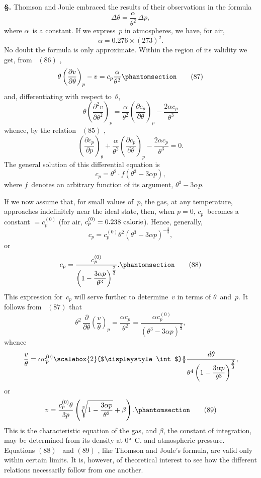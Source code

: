 \documentclass[12pt]{book}[2005/09/16]
\newcommand{\Typo}[2]{#2}
\newcommand{\Chg}[2]{#2}
\newcommand{\Add}[1]{\Chg{}{#1}}
\newcommand{\Section}[1]{
  \medskip\par\textbf{§\;#1}
  \label{section:#1}
}
\newcommand{\Tag}[1]{%
  \phantomsection\label{eqn:#1}\tag*{\ensuremath{#1}}%
}
\newcommand{\Eq}[1]{%
  \hyperref[eqn:#1]{\ensuremath{#1}}%
}
\newcommand{\PageSep}[1]{\ignorespaces}
\newcommand{\efrac}[2]{\tfrac{#1}{#2}}
\newcommand{\dd}{\partial}
\newcommand{\Unit}[1]{\text{\upshape #1}}
\newcommand{\Bigint}[1][2]{%
  \scalebox{#1}{$\displaystyle\int$}{\kern-4pt}%
}
\begin{document}
\Section{159.} Thomson and Joule embraced the results of their
observations in the formula
\[
\Delta \theta = \frac{\alpha}{\theta^{2}}\, \Delta p,
\]
where $\alpha$~is a constant. If we express~$p$ in atmospheres, we
have, for air,
\[
\alpha = 0.276 × (273)^{2}.
\]
No doubt the formula is only approximate. Within the
region of its validity we get, from~\Typo{86}{\Eq{(86)}},
\[
\theta \left(\frac{\dd v}{\dd \theta}\right)_{p} - v
  = c_{p} \frac{\alpha}{\theta^{2}}
\Tag{(87)}
\]
and, differentiating with respect to~$\theta$,
\[
\theta \left(\frac{\dd^{2} v}{\dd \theta^{2}}\right)_{p}
  = \frac{\alpha}{\theta^{2}} \left(\frac{\dd c_{p}}{\dd \theta}\right)_{p} - \frac{2\alpha c_{p}}{\theta^{3}}
\]
whence, by the relation~\Eq{(85)},
\[
\left(\frac{\dd c_{p}}{\dd p}\right)_{\theta} + \frac{\alpha}{\theta^{2}} \left(\frac{\dd c_{p}}{\dd \theta}\right)_{p} - \frac{2\alpha c_{p}}{\theta^{3}} = 0.
\]
\PageSep{126}
The general solution of this differential equation is
%
\[
c_{p} = \theta^{2} · f(\theta^{3} - 3\alpha p),
\]
where $f$~denotes an arbitrary function of its argument,
$\theta^{3} - 3\alpha p$.

If we now assume that, for small values of~$p$, the gas, at
any temperature, approaches indefinitely near the ideal state,
then, when $p = 0$, $c_{p}$~becomes a constant $= c_{p}^{(0)}$ (for air, $c_{p}^{(0)} = 0.238~\Unit{ calorie}$).
Hence, generally,
\[
c_{p} = c_{p}^{(0)} \theta^{2} (\theta^{3} - 3\alpha p)^{-\efrac{2}{3}}\Add{,}
\]
or
\[
c_{p} = \frac{c_{p}^{(0)}}{\left(1 - \dfrac{3\alpha p}{\theta^{3}}\right)^{\efrac{2}{3}}}\Add{.}
\Tag{(88)}
\]
This expression for~$c_{p}$ will serve further to determine~$v$ in
terms of $\theta$~and~$p$. It follows from~\Eq{(87)} that
\[
\theta^{2}\, \frac{\dd}{\dd \theta} \left(\frac{v}{\theta}\right)_{p}
  = \frac{\alpha c_{p}}{\theta^{2}}
  = \frac{\alpha c_{p}^{(0)}}{(\theta^{3} - 3\alpha p)^{\efrac{2}{3}}},
\]
whence
\[
\frac{v}{\theta} = \alpha c_{p}^{(0)}
  \Bigint \frac{d\theta}{\theta^{4} \left(1 - \dfrac{3\alpha p}{\theta^{3}}\right)^{\efrac{2}{3}}},
\]
or
\[
v = \frac{c_{p}^{(0)} \theta}{3p} \left(\sqrt[3]{1 - \frac{3\alpha p}{\theta^{3}}} + \beta\right).
\Tag{(89)}
\]
This is the characteristic equation of the gas, and $\beta$, the
%
constant of integration, may be determined from its density
at $0°$~C. and atmospheric pressure. Equations \Eq{(88)}~and \Eq{(89)},
like Thomson and Joule's formula, are valid only within
certain limits. It is, however, of theoretical interest to see
how the different relations necessarily follow from one
another.
\end{document}
